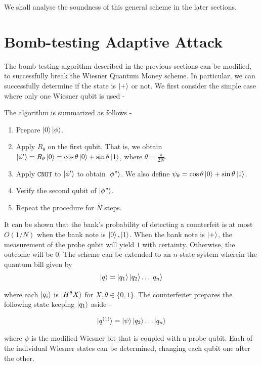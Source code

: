 \documentclass[]{article}
\newcommand*{\CNOT}{\texttt{CNOT}}
\newcommand*{\q}{\ket{\phi}}
\begin{document}
We shall analyse the soundness of this general scheme in the later sections.

\section{Bomb-testing Adaptive Attack}
The bomb testing algorithm described in the previous sections can be modified, to successfully break the Wiesner Quantum Money scheme. In particular, we can successfully determine if the state is $\ket{+}$ or not. We first consider the simple case where only one Wiesner qubit is used -

The algorithm is summarized as follows - 

\begin{enumerate}
        \item Prepare $\ket{0}\q$.
        \item Apply $R_\theta$ on the first qubit. That is, we obtain $\ket{\phi'} = R_\theta \ket{0} = \cos\theta \ket{0} + \sin\theta \ket{1}$, where $\theta = \frac{\pi}{2N}$.
        \item Apply $\CNOT$ to $\ket{\phi'}$ to obtain $\ket{\phi"}$. We also define $\psi_\theta = \cos\theta \ket{0} + \sin\theta\ket{1}$.
        \item Verify the second qubit of $\ket{\phi"}$.
        \item Repeat the procedure for $N$ steps.
    \end{enumerate}

It can be shown that the bank's probability of detecting a counterfeit is at most $O(1/N)$ when the bank note is $\ket{0}, \ket{1}$. When the bank note is $\ket{+}$, the measurement of the probe qubit will yield $1$ with certainty. Otherwise, the outcome will be $0$. The scheme can be extended to an $n$-state system wherein the quantum bill given by
\begin{align*}
    \ket{q} = \ket{q_1} \ket{q_2}\dots \ket{q_n}
\end{align*}

where each $\ket{q_i}$ is $\ket{H^\theta X}$ for $X, \theta \in \{0, 1\}$. The counterfeiter prepares the following state keeping $\ket{q_1}$ aside - 

\begin{align*}
    \ket{q^{(1)}} = \ket{\psi}\ket{q_2} \dots \ket{q_n} 
\end{align*}

where $\psi$ is the modified Wiesner bit that is coupled with a probe qubit. Each of the individual Wiesner states can be determined, changing each qubit one after the other.
\end{document}

